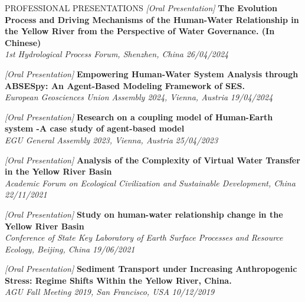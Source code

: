 \documentclass{resume} %
\newcommand{\projectentry}[4]{\textit{[#1]} {\bf #2} \\ \textnormal{\em #3} \hfill {\em #4}}
\begin{document}
\begin{rSection}{PROFESSIONAL PRESENTATIONS}
    \projectentry{Oral Presentation}{The Evolution Process and Driving Mechanisms of the Human-Water Relationship in the Yellow River from the Perspective of Water Governance. (In Chinese)}{1st Hydrological Process Forum, Shenzhen, China}{26/04/2024}

    \projectentry{Oral Presentation}{Empowering Human-Water System Analysis through ABSESpy: An Agent-Based Modeling Framework of SES.}{European Geosciences Union Assembly 2024, Vienna, Austria}{19/04/2024}

    \projectentry{Oral Presentation}{Research on a coupling model of Human-Earth system -A case study of agent-based model}{EGU General Assembly 2023, Vienna, Austria}{25/04/2023}

    \projectentry{Oral Presentation}{Analysis of the Complexity of Virtual Water Transfer in the Yellow River Basin}{Academic Forum on Ecological Civilization and Sustainable Development, China}{22/11/2021}

    \projectentry{Oral Presentation}{Study on human-water relationship change in the Yellow River Basin}{Conference of State Key Laboratory of Earth Surface Processes and Resource Ecology, Beijing, China}{19/06/2021}

    \projectentry{Oral Presentation}{Sediment Transport under Increasing Anthropogenic Stress: Regime Shifts Within the Yellow River, China.}{AGU Fall Meeting 2019, San Francisco, USA}{10/12/2019}
\end{rSection}

\end{document}
